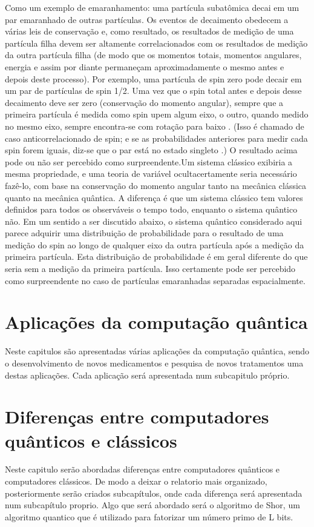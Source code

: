 \documentclass{report}
\begin{document}
\newline
Como um exemplo de emaranhamento: uma partícula subatômica decai em um par emaranhado de outras partículas. Os eventos de decaimento obedecem a várias leis de conservação e, como resultado, os resultados de medição de uma partícula filha devem ser altamente correlacionados com os resultados de medição da outra partícula filha (de modo que os momentos totais, momentos angulares, energia e assim por diante permaneçam aproximadamente o mesmo antes e depois deste processo). Por exemplo, uma partícula de spin zero pode decair em um par de partículas de spin 1/2. Uma vez que o spin total antes e depois desse decaimento deve ser zero (conservação do momento angular), sempre que a primeira partícula é medida como spin upem algum eixo, o outro, quando medido no mesmo eixo, sempre encontra-se com rotação para baixo . (Isso é chamado de caso anticorrelacionado de spin; e se as probabilidades anteriores para medir cada spin forem iguais, diz-se que o par está no estado singleto .)
\newline
O resultado acima pode ou não ser percebido como surpreendente.Um sistema clássico exibiria a mesma propriedade, e uma teoria de variável ocultacertamente seria necessário fazê-lo, com base na conservação do momento angular tanto na mecânica clássica quanto na mecânica quântica. A diferença é que um sistema clássico tem valores definidos para todos os observáveis o tempo todo, enquanto o sistema quântico não. Em um sentido a ser discutido abaixo, o sistema quântico considerado aqui parece adquirir uma distribuição de probabilidade para o resultado de uma medição do spin ao longo de qualquer eixo da outra partícula após a medição da primeira partícula. Esta distribuição de probabilidade é em geral diferente do que seria sem a medição da primeira partícula. Isso certamente pode ser percebido como surpreendente no caso de partículas emaranhadas separadas espacialmente.


\chapter{Aplicações da computação quântica}
\label{chap.aplicacoes}
Neste capitulos são apresentadas várias aplicações da computação quântica, sendo o desenvolvimento de novos medicamentos e pesquisa de novos tratamentos uma destas aplicações. Cada aplicação será apresentada num subcapitulo próprio.

\chapter{Diferenças entre computadores quânticos e clássicos}
\label{chap.diferencas}
Neste capitulo serão abordadas diferenças entre computadores quânticos e computadores clássicos. De modo a deixar o relatorio mais organizado, posteriormente
serão criados subcapítulos, onde cada diferença será apresentada num subcapítulo proprio.
Algo que será abordado será o algoritmo de Shor, um algoritmo quantico que é utilizado para fatorizar um número primo de L bits.
\end{document}
